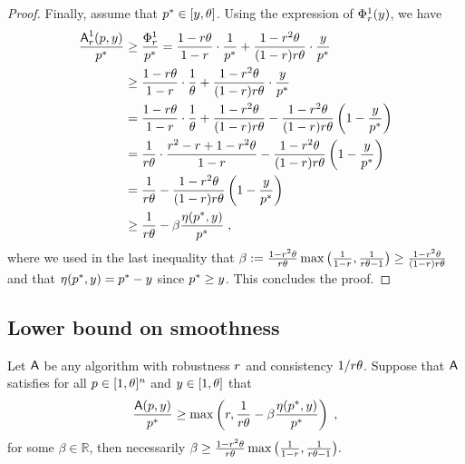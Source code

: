 \begin{proof}
Finally, assume that $p^* \in [y, \theta]$. Using the expression of $\Phi^1_r(y)$, we have 
\begin{align*}
\frac{\mbox{\textup{\textsf{A}}}^1_r(p, y)}{p^*}
&\geq \frac{\Phi^1_r}{p^*}
= \frac{1-r \theta}{1-r} \cdot \frac{1}{p^*} + \frac{1-r^2 \theta}{(1-r)r \theta}\cdot\frac{y}{p^*}\\
&\geq \frac{1-r \theta}{1-r} \cdot \frac{1}{\theta} + \frac{1-r^2 \theta}{(1-r)r \theta}\cdot\frac{y}{p^*}\\
&= \frac{1-r \theta}{1-r} \cdot \frac{1}{\theta} + \frac{1-r^2 \theta}{(1-r)r \theta} - \frac{1-r^2 \theta}{(1-r)r \theta}\left( 1 - \frac{y}{p^*} \right)\\
&= \frac{1}{r \theta}\cdot \frac{r^2 - r + 1 - r^2\theta}{1-r} - \frac{1-r^2 \theta}{(1-r)r \theta}\left( 1 - \frac{y}{p^*} \right)\\
&= \frac{1}{r \theta} - \frac{1-r^2 \theta}{(1-r)r \theta}\left( 1 - \frac{y}{p^*} \right)\\
&\geq \frac{1}{r \theta} - \beta \frac{\eta(p^*, y)}{p^*}\;,
\end{align*}
where we used in the last inequality that $\beta:= \frac{1-r^2\theta}{r \theta} \max\big( \frac{1}{1-r}, \frac{1}{r \theta - 1} \big) \geq \frac{1-r^2\theta}{(1-r)r \theta}$ and that $\eta(p^*, y) = p^* - y$ since $p^* \geq y$. This concludes the proof.
\end{proof}



\subsection{Lower bound on smoothness}

\begin{lemma}\label{lem:impoosibility-smoothness-ADD}
Let $\mbox{\textup{\textsf{A}}}$ be any algorithm with robustness $r$ and consistency $1/r \theta$. Suppose that $\mbox{\textup{\textsf{A}}}$ satisfies for all $p \in [1,\theta]^n$ and $y \in [1,\theta]$ that
\begin{equation}
\frac{\mbox{\textup{\textsf{A}}}(p, y)}{p^*} \geq 
\max\left(
r, \frac{1}{r \theta} - \beta \frac{\eta(p^*, y)}{p^*}
\right)\;,
\end{equation}
for some $\beta \in \mathbb{R}$, then necessarily $\beta \geq \frac{1-r^2\theta}{r \theta} \max\big( \frac{1}{1-r}, \frac{1}{r \theta - 1} \big).$
\end{lemma}

